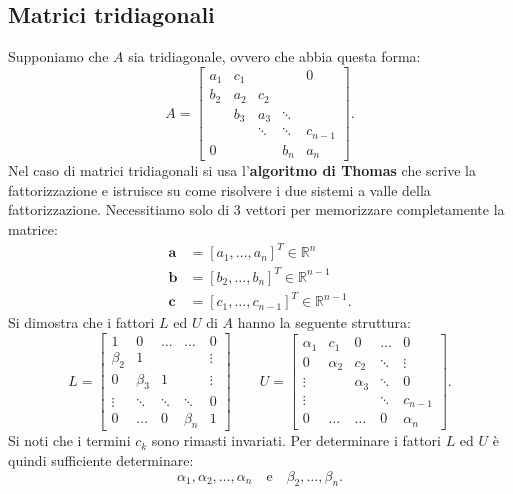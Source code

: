 \subsection{Matrici tridiagonali}

Supponiamo che $\displaystyle A$ sia tridiagonale, ovvero che abbia questa forma:
\begin{equation*}
    A=
    \begin{bmatrix}
        a_{1} & c_{1} &        &        & 0       \\
        b_{2} & a_{2} & c_{2}  &        &         \\
              & b_{3} & a_{3}  & \ddots &         \\
              &       & \ddots & \ddots & c_{n-1} \\
        0     &       &        & b_{n}  & a_{n}
    \end{bmatrix}.
\end{equation*}
Nel caso di matrici tridiagonali si usa l'\textbf{algoritmo di Thomas} che scrive la fattorizzazione e istruisce su come risolvere i due sistemi a valle della fattorizzazione.
Necessitiamo solo di $3$ vettori per memorizzare completamente la matrice:
\begin{align*}
\mathbf{a} & =[ a_{1} ,\dotsc ,a_{n}]^{T} \in \mathbb{R}^{n}\\
\mathbf{b} & =[ b_{2} ,\dotsc ,b_{n}]^{T} \in \mathbb{R}^{n-1}\\
\mathbf{c} & =[ c_{1} ,\dotsc ,c_{n-1}]^{T} \in \mathbb{R}^{n-1}.
\end{align*}
Si dimostra che i fattori $\displaystyle L$ ed $U$ di $\displaystyle A$ hanno la seguente struttura:
\begin{equation*}
L=\begin{bmatrix}
1 & 0 & \dotsc  & \dotsc  & 0\\
\beta _{2} & 1 &  &  & \vdots \\
0 & \beta _{3} & 1 &  & \vdots \\
\vdots  & \ddots  & \ddots  & \ddots  & 0\\
0 & \dotsc  & 0 & \beta _{n} & 1
\end{bmatrix} \qquad U=\begin{bmatrix}
\alpha _{1} & c_{1} & 0 & \dotsc  & 0\\
0 & \alpha _{2} & c_{2} & \ddots  & \vdots \\
\vdots  &  & \alpha _{3} & \ddots  & 0\\
\vdots  &  &  & \ddots  & c_{n-1}\\
0 & \dotsc  & \dotsc  & 0 & \alpha _{n}
\end{bmatrix}.
\end{equation*}
Si noti che i termini $c_{k}$ sono rimasti invariati.
Per determinare i fattori $\displaystyle L$ ed $U$ è quindi sufficiente determinare:
\begin{equation*}
\alpha _{1} ,\alpha _{2} ,\dotsc ,\alpha _{n} \quad \text{e} \quad \beta _{2} ,\dotsc ,\beta _{n}.
\end{equation*}

